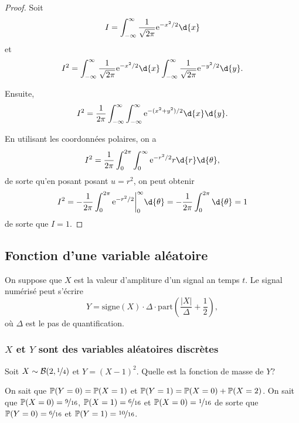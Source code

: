 \documentclass[11pt]{article}
\renewcommand\P{%
	\ensuremath{%
		\mathbb{P}%
	}%
}%
\newcommand\e{%
	\ensuremath{%
		\mathrm{e}%
	}%
}%
\newcommand\bin{%
	\ensuremath{%
		\mathcal{B}%
	}%
}%
\begin{document}
\begin{proof}
	Soit
	\begin{equation*}
		I=\int_{-\infty}^\infty\frac{1}{\sqrt{2\pi}}\e^{-x^2/2}\d{x}
	\end{equation*}
	et
	\begin{equation*}
		I^2=
			\int_{-\infty}^\infty\frac{1}{\sqrt{2\pi}}\e^{-x^2/2}\d{x}
			\int_{-\infty}^\infty\frac{1}{\sqrt{2\pi}}\e^{-y^2/2}\d{y}.
	\end{equation*}

	Ensuite,
	\begin{equation*}
		I^2=\frac{1}{2\pi}\int_{-\infty}^\infty\int_{-\infty}^\infty
			\e^{-(x^2+y^2)/2}\d{x}\d{y}.
	\end{equation*}

	En utilisant les coordonnées polaires, on a
	\begin{equation*}
		I^2=\frac{1}{2\pi}\int_0^{2\pi}\int_0^\infty
			\e^{-r^2/2}r\d{r}\d{\theta},
	\end{equation*}
	de sorte qu'en posant posant $u=r^2$, on peut obtenir
	\begin{equation*}
		I^2=-\frac{1}{2\pi}\int_0^{2\pi}
			\e^{-r^2/2}\bigg\rvert_0^\infty\d{\theta}=
		-\frac{1}{2\pi}\int_0^{2\pi}\d{\theta}=1
	\end{equation*}
	de sorte que $I=1$.
\end{proof}

\subsection{Fonction d'une variable aléatoire}
\begin{exemple}
	On suppose que $X$ est la valeur d'ampliture d'un signal an temps $t$. Le
	signal numérisé peut s'écrire
	\begin{equation*}
		Y=\mathrm{signe}(X)\cdot\Delta\cdot\mathrm{part}\left(
			\frac{|X|}{\Delta}+\frac{1}{2}
		\right),
	\end{equation*}
	où $\Delta$ est le pas de quantification.
\end{exemple}

\subsubsection{$X$ et $Y$ sont des variables aléatoires discrètes}
%
%
\begin{exemple}
	Soit $X\sim\bin(2,\nicefrac{1}{4})$ et $Y=(X-1)^2$. Quelle est la fonction
	de masse de $Y$?

	On sait que $\P(Y=0)=\P(X=1)$ et $\P(Y=1)=\P(X=0)+\P(X=2)$. On sait que
	$\P(X=0)=\nicefrac{9}{16}$, $\P(X=1)=\nicefrac{6}{16}$ et $\P(X=0)=
	\nicefrac{1}{16}$ de sorte que $\P(Y=0)=\nicefrac{6}{16}$ et
	$\P(Y=1)=\nicefrac{10}{16}$.
\end{exemple}
\end{document}
